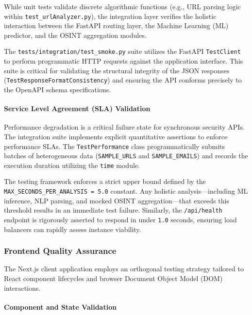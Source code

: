 While unit tests validate discrete algorithmic functions (e.g., URL
parsing logic within \texttt{test\_urlAnalyzer.py}), the integration
layer verifies the holistic interaction between the FastAPI routing
layer, the Machine Learning (ML) predictor, and the OSINT aggregation
modules.

The \texttt{tests/integration/test\_smoke.py} suite utilizes the FastAPI
\texttt{TestClient} to perform programmatic HTTP requests against the
application interface. This suite is critical for validating the
structural integrity of the JSON responses
(\texttt{TestResponseFormatConsistency}) and ensuring the API conforms
precisely to the OpenAPI schema specifications.

\paragraph{Service Level Agreement (SLA)
Validation}\label{service-level-agreement-sla-validation}

Performance degradation is a critical failure state for synchronous
security APIs. The integration suite implements explicit quantitative
assertions to enforce performance SLAs. The \texttt{TestPerformance}
class programmatically submits batches of heterogeneous data
(\texttt{SAMPLE\_URLS} and \texttt{SAMPLE\_EMAILS}) and records the
execution duration utilizing the \texttt{time} module.

The testing framework enforces a strict upper bound defined by the
\texttt{MAX\_SECONDS\_PER\_ANALYSIS\ =\ 5.0} constant. Any holistic
analysis---including ML inference, NLP parsing, and mocked OSINT
aggregation---that exceeds this threshold results in an immediate test
failure. Similarly, the \texttt{/api/health} endpoint is rigorously
asserted to respond in under \texttt{1.0} seconds, ensuring load
balancers can rapidly assess instance viability.

\subsubsection{Frontend Quality
Assurance}\label{frontend-quality-assurance}

The Next.js client application employs an orthogonal testing strategy
tailored to React component lifecycles and browser Document Object Model
(DOM) interactions.

\paragraph{Component and State
Validation}\label{component-and-state-validation}

